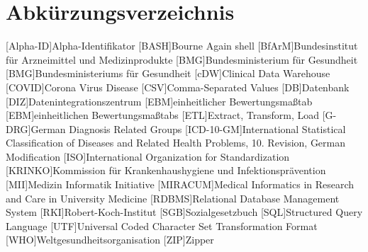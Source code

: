 \chapter*{Abkürzungsverzeichnis}
\setcounter{page}{4}
\begin{acronym}[ICD-10-GM]
	[Alpha-ID]{Alpha-Identifikator}
	[BASH]{Bourne Again shell}		
	[BfArM]{Bundesinstitut für Arzneimittel und Medizinprodukte}
	[BMG]{Bundesministerium für Gesundheit}	
	[BMG]{Bundesministeriums für Gesundheit}
	[cDW]{Clinical Data Warehouse}
	[COVID]{Corona Virus Disease}	
	[CSV]{Comma-Separated Values}	
	[DB]{Datenbank}
	[DIZ]{Datenintegrationszentrum}	
	[EBM]{einheitlicher Bewertungsmaßtab}
	[EBM]{einheitlichen Bewertungsmaßtabs}
	[ETL]{Extract, Transform, Load}
	[G-DRG]{German Diagnosis Related Groups}	
	[ICD-10-GM]{International Statistical Classification of Diseases and Related Health Problems, 10. Revision, German Modification}	
	[ISO]{International Organization for Standardization}
	[KRINKO]{Kommission für Krankenhaushygiene und Infektionsprävention}	
	[MII]{Medizin Informatik Initiative}
	[MIRACUM]{Medical Informatics in Research and Care in University Medicine}
	[RDBMS]{Relational Database Management System}	
	[RKI]{Robert-Koch-Institut}
	[SGB]{Sozialgesetzbuch}
	[SQL]{Structured Query Language}
	[UTF]{Universal Coded Character Set Transformation Format}
	[WHO]{Weltgesundheitsorganisation}
	[ZIP]{Zipper}
\end{acronym}

